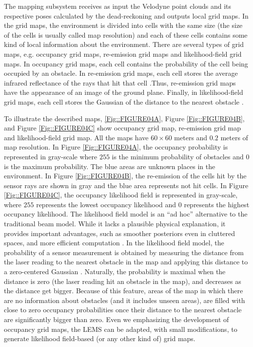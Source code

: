 The mapping subsystem receives as input the Velodyne point clouds and its respective poses calculated by the dead-reckoning and outputs local grid maps.  In the grid maps, the environment is divided into cells with the same size (the size of the cells is usually called map resolution) and each of these cells contains some kind of local information about the environment.  There are several types of grid maps, e.g. occupancy grid maps, re-emission grid maps and likelihood-field grid maps. In occupancy grid maps, each cell contains the probability of the cell being occupied by an obstacle. In re-emission grid maps, each cell stores the average infrared reflectance of the rays that hit that cell \cite{13levinson2007map}.Thus, re-emission grid maps have the appearance of an image of the ground plane. Finally, in likelihood-field grid maps, each cell stores the Gaussian of the distance to the nearest obstacle \cite{26thrun2005probabilistic}.

To illustrate the described maps, \ref{Fig::FIGURE04A}, Figure \ref{Fig::FIGURE04B}, and Figure \ref{Fig::FIGURE04C} show occupancy grid map, re-emission grid map and likelihood-field grid map. All the maps have $60\times60$ meters and $0.2$ meters of map resolution. In Figure \ref{Fig::FIGURE04A}, the occupancy probability is represented in gray-scale where $255$ is the minimum probability of obstacles and $0$ is the maximum probability. The blue areas are unknown places in the environment. In Figure \ref{Fig::FIGURE04B}, the re-emission of the cells hit by the sensor rays are shown in gray and the blue area represents not hit cells. In Figure \ref{Fig::FIGURE04C}, the occupancy likelihood field is represented in gray-scale, where $255$ represents the lowest occupancy likelihood and $0$ represents the highest occupancy likelihood. The likelihood field model is an ``ad hoc'' alternative to the traditional beam model. While it lacks a plausible physical explanation, it provides important advantages, such as smoother posteriors even in cluttered spaces, and more efficient computation \cite{26thrun2005probabilistic}. In the likelihood field model, the probability of a sensor measurement is obtained by measuring the distance from the laser reading to the nearest obstacle in the map and applying this distance to a zero-centered Gaussian \cite{26thrun2005probabilistic}. Naturally, the probability is maximal when the distance is zero (the laser reading hit an obstacle in the map), and decreases as the distance get bigger. Because of this feature, areas of the map in which there are no information about obstacles (and it includes unseen areas), are filled with close to zero occupancy probabilities once their distance to the nearest obstacle are significantly bigger than zero. Even we emphasizing the development of occupancy grid maps, the LEMS can be adapted, with small modifications, to generate likelihood field-based (or any other kind of) grid maps.

